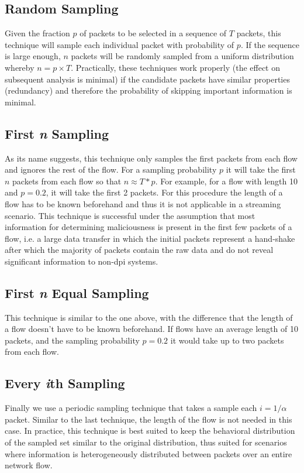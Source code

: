 \documentclass[conference]{IEEEtran}
\begin{document}
\subsection{Random Sampling}

Given the fraction $p$ of packets to be selected in a sequence of $T$ packets, this technique will sample each individual packet with probability of $p$. If the sequence is large enough, $n$ packets will be randomly sampled from a uniform distribution whereby $n= p \times T$. Practically, these techniques work properly (the effect on subsequent analysis is minimal) if the candidate packets have similar properties (redundancy) and therefore the probability of skipping important information is minimal.

\subsection{First \emph{n} Sampling}
As its name suggests, this technique only samples the first packets from each flow and ignores the rest of the flow. For a sampling probability $p$ it will take the first $n$ packets from each flow so that $n \approx T * p$. For example, for a flow with length 10 and $p=0.2$, it will take the first 2 packets. For this procedure the length of a flow has to be known beforehand and thus it is not applicable in a streaming scenario. This technique is successful under the assumption that most information for determining maliciousness is present in the first few packets of a flow, i.e. a large data transfer in which the initial packets represent a hand-shake after which the majority of packets contain the raw data and do not reveal significant information to non-\gls{dpi} systems.

\subsection{First \emph{n} Equal Sampling}
This technique is similar to the one above, with the difference that the length of a flow doesn't have to be known beforehand. If flows have an average length of 10 packets, and the sampling probability $p=0.2$ it would take up to two packets from each flow.

\subsection{Every \emph{i}th Sampling}
Finally we use a periodic sampling technique that takes a sample each $i= 1/ \alpha$ packet. Similar to the last technique, the length of the flow is not needed in this case. In practice, this technique is best suited to keep the behavioral distribution of the sampled set similar to the original distribution, thus suited for scenarios where information is heterogeneously distributed between packets over an entire network flow.
\end{document}
